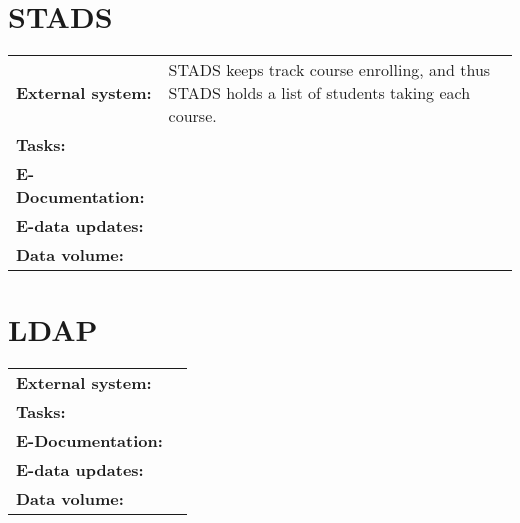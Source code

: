 \documentclass[Main]{subfiles}
\begin{document}
\section{STADS}\label{sec:STADS}
\begin{tabular}{l  p{13cm}}
 \textbf{External system:} & STADS keeps track course enrolling, and thus STADS holds a list of students taking each course. \\
 \textbf{Tasks:} &  \\
 \textbf{E-Documentation:} & \\
 \textbf{E-data updates:} & \\
 \textbf{Data volume:} & \\
\end{tabular}



\section{LDAP}\label{sec:LDAP}
\begin{tabular}{l  p{13cm}}
 \textbf{External system:} &  \\
 \textbf{Tasks:} &   \\
 \textbf{E-Documentation:} & \\
 \textbf{E-data updates:} & \\
 \textbf{Data volume:} & \\
\end{tabular}
\end{document}
